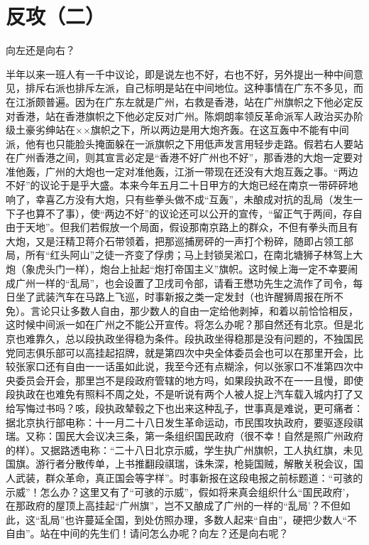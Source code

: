 \section[反攻（二）]{反攻（二）}


向左还是向右？

半年以来一班人有一千中议论，即是说左也不好，右也不好，另外提出一种中间意见，排斥右派也排斥左派，自己标明是站在中间地位。这种事情在广东不多见，而在江浙颇普遍。因为在广东左就是广州，右救是香港，站在广州旗帜之下他必定反对香港，站在香港旗帜之下他必定反对广州。陈炯朗率领反革命派军人政治买办阶级土豪劣绅站在××旗帜之下，所以两边是用大炮齐轰。在这互轰中不能有中间派，他有也只能脸头掩面躲在一派旗帜之下用低声发言用轻步走路。假若右人要站在广州香港之间，则其宣言必定是“香港不好广州也不好”，那香港的大炮一定要对准他轰，广州的大炮也一定对准他轰，江浙一带现在还没有大炮互轰之事。“两边不好”的议论于是乎大盛。本来今年五月二十日甲方的大炮已经在南京一带砰砰地响了，幸喜乙方没有大炮，只有些拳头做不成“互轰”，未酿成对抗的乱局（发生一下子也算不了事），使“两边不好”的议论还可以公开的宣传，“留正气于两间，存自由于天地”。但我们若假放一个局面，假设那南京路上的群众，不但有拳头而且有大炮，又是汪精卫蒋介石带领着，把那巡捕房砰的一声打个粉碎，随即占领工部局，所有“红头阿山”之徒一齐变了俘虏；马上封锁吴淞口，在南北塘狮子林驾上大炮（象虎头门一样），炮台上扯起“炮打帝国主义”旗帜。这时候上海一定不幸要闹成广州一样的“乱局”，也会设置了卫戌司令部，请看王懋功先生之流作了司令，每日坐了武装汽车在马路上飞巡，时事新报之类一定发封（也许醒狮周报在所不免）。言论只让多数人自由，那少数人的自由一定给他剥掉，和着以前恰恰相反，这时候中间派一如在广州之不能公开宣传。将怎么办呢？那自然还有北京。但是北京也难靠久，总以段执政坐得稳为条件。段执政坐得稳那是没有问题的，不独国民党同志俱乐部可以高挂起招牌，就是第四次中央全体委员会也可以在那里开会，比较张家口还有自由一一话虽如此说，我至今还有点糊涂，何以张家口不准第四次中央委员会开会，那里岂不是段政府管辖的地方吗，如果段执政不在一一且慢，即使段执政在也难免有照料不周之处，不是听说有两个人被人捉上汽车载入城内打了又给写悔过书吗？咳，段执政辇毂之下也出来这种乱子，世事真是难说，更可痛者：据北京执行部电称：十一月二十八日发生革命运动，市民围攻执政府，要驱逐段祺瑞。又称：国民大会议决三条，第一条组织国民政府（很不幸！自然是照广州政府的样）。又据路透电称：“二十八日北京示威，学生执广州旗帜，工人执红旗，未见国旗。游行者分散传单，上书推翻段祺瑞，诛朱深，枪毙国贼，解散关税会议，国人武装，群众革命，真正国会等字样”。时事新报在这段电报之前标题道：“可骇的示威”！怎么办？这里又有了“可骇的示威”，假如将来真会组织什么“国民政府’，在那政府的屋顶上高挂起“广州旗”，岂不又酿成了广州的一样的“乱局’？不但如此，这“乱局”也许蔓延全国，到处仿照办理，多数人起来“自由”，硬把少数人“不自由”。站在中间的先生们！请问怎么办呢？向左？还是向右呢？

